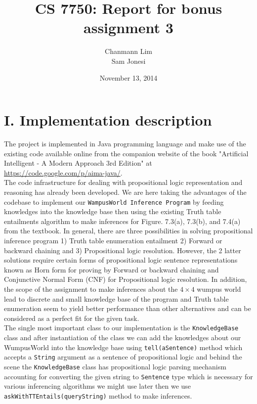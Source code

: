 \documentclass[a4paper]{report}
\begin{document}
\title{CS 7750: Report for bonus assignment 3}
\author{Chanmann Lim \\Sam Jonesi}
\date{November 13, 2014}
\maketitle

\lstset{language=Java,title=\lstname,basicstyle=\footnotesize}

\section*{I. Implementation description}

The project is implemented in Java programming language and make use of the existing code available online from the companion website of the book "Artificial Intelligent - A Modern Approach 3rd Edition" at \url{https://code.google.com/p/aima-java/}. \\

The code infrastructure for dealing with propositional logic representation and reasoning has already been developed. We are here taking the advantages of the codebase to implement our \texttt{WampusWorld Inference Program} by feeding knowledges into the knowledge base then using the existing Truth table entailments algorithm to make inferences for Figure. 7.3(a), 7.3(b), and 7.4(a) from the textbook. In general, there are three possibilities in solving propositional inference program 1) Truth table enumeration entailment 2) Forward or backward chaining and 3) Propositional logic resolution. However, the 2 latter solutions require certain forms of propositional logic sentence representations known as Horn form for proving by Forward or backward chaining and Conjunctive Normal Form (CNF) for Propositional logic resolution. In addition, the scope of the assignment to make inferences about the $4\times4$ wumpus world lead to discrete and small knowledge base of the program and Truth table enumeration seem to yield better performance than other alternatives and can be considered as a perfect fit for the given task. \\

The single most important class to our implementation is the \texttt{KnowledgeBase} class and after instantiation of the class we can add the knowledges about our WumpusWorld into the knowledge base using \texttt{tell(aSentence)} method which accepts a \texttt{String} argument as a sentence of propositional logic and behind the scene the \texttt{KnowledgeBase} class has propositional logic parsing mechanism accounting for converting the given string to \texttt{Sentence} type which is necessary for various inferencing algorithms we might use later then we use \texttt{askWithTTEntails(queryString)} method to make inferences. \\
\end{document}
